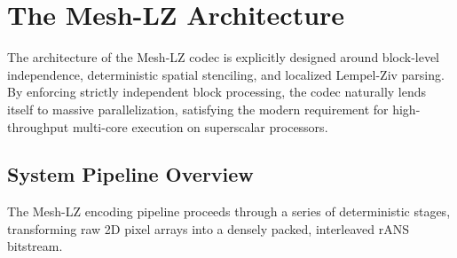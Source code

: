 \chapter{The Mesh-LZ Architecture}
\label{ch:architecture}

The architecture of the Mesh-LZ codec is explicitly designed around block-level independence, deterministic spatial stenciling, and localized Lempel-Ziv parsing. By enforcing strictly independent block processing, the codec naturally lends itself to massive parallelization, satisfying the modern requirement for high-throughput multi-core execution on superscalar processors.

\section{System Pipeline Overview}

The Mesh-LZ encoding pipeline proceeds through a series of deterministic stages, transforming raw 2D pixel arrays into a densely packed, interleaved rANS bitstream.

